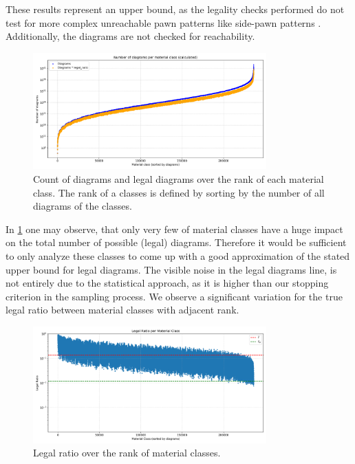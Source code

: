 \documentclass[12pt]{article}
\begin{document}
These results represent an upper bound, as the legality checks performed do not test for more complex unreachable pawn patterns like side-pawn patterns \cite{mcdonagh2022}. Additionally, the diagrams are not checked for reachability.

\begin{figure}[h!]
  \centering
  \includegraphics[width=0.8\textwidth]{diagrams_per_class.png}
  \caption{Count of diagrams and legal diagrams over the rank of each material class. The rank of a classes is defined by sorting by the number of all diagrams of the classes.}
  \label{fig:diagrams_per_class}
\end{figure}
In \ref{fig:diagrams_per_class} one may observe, that only very few of material classes have a huge impact on the total number of possible (legal) diagrams. Therefore it would be sufficient to only analyze these classes to come up with a good approximation of the stated upper bound for legal diagrams. The visible noise in the legal diagrams line, is not entirely due to the statistical approach, as it is higher than our stopping criterion in the sampling process. We observe a significant variation for the true legal ratio between material classes with adjacent rank.

\begin{figure}[h!]
  \centering
  \includegraphics[width=0.8\textwidth]{legal_ratio_per_class.png}
  \caption{Legal ratio over the rank of material classes.}
  \label{fig:legal_ratio_by_class}
\end{figure}
\end{document}
